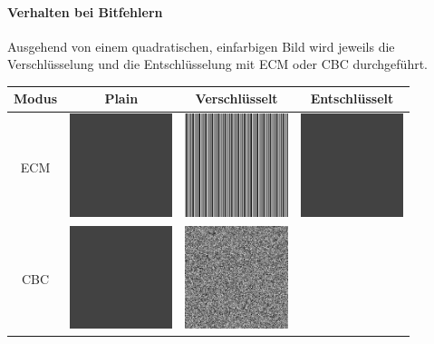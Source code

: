 \paragraph{Verhalten bei Bitfehlern} Ausgehend von einem quadratischen, einfarbigen Bild wird
jeweils die Verschlüsselung und die Entschlüsselung mit ECM oder CBC durchgeführt.
\begin{table}
    \begin{center}
        \begin{tabular}{|c|c|c|c|}
        \hline
        Modus &Plain & Verschlüsselt & Entschlüsselt\\
        \hline
        ECM &
        \includegraphics[width=3cm]{img/no_error/original} &
        \includegraphics[width=3cm]{img/no_error/output_ECM} &
        \includegraphics[width=3cm]{img/no_error/output_ECM_decrypt} \\
        \hline
        CBC &
        \includegraphics[width=3cm]{img/no_error/original} &
        \includegraphics[width=3cm]{img/no_error/output_CBC} &

\end{tabular}
\end{center}
\end{table}
